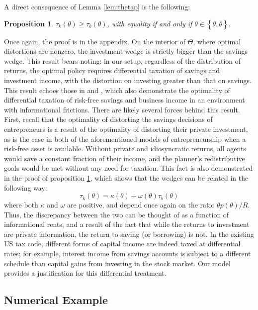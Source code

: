 \documentclass[11pt]{article}
\newtheorem{proposition}{Proposition}
\begin{document}
A direct consequence of Lemma \ref{lem:thetap} is the following: 
\begin{proposition} \label{prop:tauk_bigger}
    \( \tau_{k}\left(\theta\right)\ge\tau_{b}\left(\theta\right) \), with equality if and only if \( \theta\in\left\{ \underline{\theta},\overline{\theta}\right\}  \).
\end{proposition}
Once again, the proof is in the appendix. On the interior of \( \Theta \), where optimal distortions are nonzero, the investment wedge is strictly bigger than the savings wedge. This result bears noting: in our setup, regardless of the distribution of returns, the optimal policy requires differential taxation of savings and investment income, with the distortion on investing greater than that on savings. This result echoes those in \cite{albanesi2006optimal} and \cite{phelan2019differential}, which also demonstrate the optimality of differential taxation of risk-free savings and business income in an environment with informational frictions. There are likely several forces behind this result. First, recall that the optimality of distorting the savings decisions of entrepreneurs is a result of the optimality of distorting their private investment, as is the case in both of the aforementioned models of entrepreneurship when a risk-free asset is available. Without private and idiosyncratic returns, all agents would save a constant fraction of their income, and the planner's redistributive goals would be met without any need for taxation. This fact is also demonstrated in the proof of proposition \ref{prop:tauk_bigger}, which shows that the wedges can be related in the following way:
\begin{equation}
    \tau_k(\theta) = \kappa(\theta) + \omega(\theta)\tau_b(\theta)
\end{equation}
where both \( \kappa \) and \( \omega \) are positive, and depend once again on the ratio \( \theta p(\theta) /R\). Thus, the discrepancy between the two can be thought of as a function of informational rents, and a result of the fact that while the returns to investment are private information, the return to saving (or borrowing) is not. In the existing US tax code, different forms of capital income are indeed taxed at differential rates; for example, interest income from savings accounts is subject to a different schedule than capital gains from investing in the stock market. Our model provides a justification for this differential treatment. 

\subsection{Numerical Example}
\end{document}
